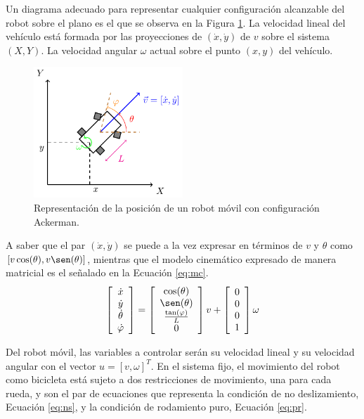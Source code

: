 \par Un diagrama adecuado para representar cualquier configuración alcanzable del robot sobre el plano es el que se observa en la Figura \ref{fig:pose}. La velocidad lineal del vehículo está formada por las proyecciones de $(\dot{x}, \dot{y})$ de $v$ sobre el sistema $(X, Y)$. La velocidad angular $\omega$ actual sobre el punto $(x, y)$ del vehículo.
\begin{figure}[htbp!]
	\centering
	\includegraphics[width=0.5\textwidth]{./Figuras/Carro/Carro}
	\caption{Representación de la posición de un robot móvil con configuración Ackerman.}
	\label{fig:pose}
\end{figure}
\par A saber que el par $(\dot{x}, \dot{y})$ se puede a la vez expresar en términos de $v$ y $\theta$ como $[v\cos(\theta), v\sen(\theta)]$, mientras que el modelo cinemático expresado de manera matricial es el señalado en la Ecuación \eqref{eq:mc}. 
\begin{equation}\label{eq:mc}
	\left[\begin{array}{c}
	\dot{x}\\
	\dot{y}\\
	\dot{\theta}\\
	\dot{\varphi}
	\end{array}\right]=
	\left[\begin{array}{c}
	\cos(\theta)\\
	\sen(\theta)\\
	\frac{\tan(\varphi)}{L}\\
	0
	\end{array}\right]v+
	\left[\begin{array}{c}
	0\\
	0\\
	0\\
	1
	\end{array}\right]\omega
\end{equation}
\par Del robot móvil, las variables a controlar serán su velocidad lineal y su velocidad angular con el vector $u=[v, \omega]^{T}$. En el sistema fijo, el movimiento del robot como bicicleta está sujeto a dos restricciones de movimiento, una para cada rueda, y son el par de ecuaciones que representa la condición de no deslizamiento, Ecuación \eqref{eq:ns}, y la condición de rodamiento puro, Ecuación \eqref{eq:pr}.
